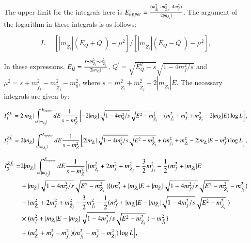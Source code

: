 \documentclass[final,3p,times]{elsarticle}
\begin{document}
The upper limit for the integrals here is $E_{upper} = {(m_{\tilde{Z}_i}^2 + m_{\tilde{Z}_j}^2 -4 m_{f}^2) \over 2|m_{\tilde{Z}_i}|}$. The argument of the logarithm in these integrals is as follows:

\begin{equation}
L = [|m_{\tilde{Z}_i}|(E_{Q} + Q^{'})- \mu^2]/[|m_{\tilde{Z}_i}|(E_{Q} - Q^{'}) - \mu^2],
\end{equation}

In these expressions, $E_{Q} = {s + m_{\tilde{Z}_i}^2 - m_{\tilde{Z}_j}^2 \over 2|m_{\tilde{Z}_i}|}$, $Q^{'} = \sqrt{E_{Q}^2 - s}\sqrt{1 - 4m_{f}^2/s}$ and $\mu^2 = s + m_{\tilde{f}_1}^2 - m_{\tilde{Z}_j}^2 - m_{q}^2$, where $s = m_{\tilde{Z}_i}^2 + m_{\tilde{Z}_j}^2 - 2|m_{\tilde{Z}_i}|E$. The necessary integrals are given by:

\begin{equation}
I_{1}^{Z \tilde{f}_1} = 2|m_{\tilde{Z}_i}|\int_{|m_{\tilde{Z}_j}|}^{E_{upper}} dE {1 \over s-m_{Z}^2}\left[-2|m_{\tilde{Z}_i}|\sqrt{1- 4m_{q}^2/s}\sqrt{E^2 - m_{\tilde{Z}_j}^2} - (m_{\tilde{f}_1}^2 - m_{f}^2 + m_{\tilde{Z}_j}^2 - 2|m_{\tilde{Z}_i}|E) \log L\right],
\end{equation}

\begin{equation}
I_{2}^{Z \tilde{f}_1} = 2|m_{\tilde{Z}_i}|\int_{|m_{\tilde{Z}_j}|}^{E_{upper}} dE {1 \over s-m_{Z}^2}\left[2|m_{\tilde{Z}_i}|\sqrt{1- 4m_{q}^2/s}\sqrt{E^2 - m_{\tilde{Z}_j}^2} + (m_{\tilde{f}_1}^2 + m_{\tilde{Z}_i}^2 - 2|m_{\tilde{Z}_i}|E - m_{f}^2 ) \log L\right]	,
\end{equation}

\begin{equation}
\begin{aligned}
I_{3}^{Z \tilde{f}_1} = & 2|m_{\tilde{Z}_i}|\int_{|m_{\tilde{Z}_j}|}^{E_{upper}} dE {1 \over s-m_{Z}^2}\Big[\{m_{\tilde{Z}_i}^2 + 2m_{f}^2 + m_{\tilde{Z}_j}^2 - {3 \over 2}m_{\tilde{f}_1}^2 - {1 \over 2}(m_{f}^2 + |m_{\tilde{Z}_i}|E \\ & + |m_{\tilde{Z}_i}|\sqrt{1-4m_{f}^2/s}\sqrt{E^2-m_{\tilde{Z}_j}^2}\ ) \} (m_{f}^2 + |m_{\tilde{Z}_i}|E + |m_{\tilde{Z}_i}|\sqrt{1-4m_{f}^2/s}\sqrt{E^2-m_{\tilde{Z}_j}^2} - m_{\tilde{f}_1}^2) \\ & - \{m_{\tilde{Z}_i}^2 + 2m_{f}^2 + m_{\tilde{Z}_j}^2 - {3 \over 2}m_{\tilde{f}_1}^2 - {1 \over 2}(m_{f}^2 + |m_{\tilde{Z}_i}|E - |m_{\tilde{Z}_i}|\sqrt{1-4m_{f}^2/s}\sqrt{E^2-m_{\tilde{Z}_j}^2}\ ) \\ & \times (m_{f}^2 + |m_{\tilde{Z}_i}|E - |m_{\tilde{Z}_i}|\sqrt{1-4m_{f}^2/s}\sqrt{E^2-m_{\tilde{Z}_j}^2}\ ) -m_{\tilde{f}_1}^2 \}\\ & + (m_{\tilde{Z}_i}^2 +m_{f}^2 - m_{\tilde{f}_1}^2)(m_{\tilde{f}_1}^2 - m_{f}^2 - m_{\tilde{Z}_j}^2) \log L\Big], 
\end{aligned}
\end{equation}
\end{document}
